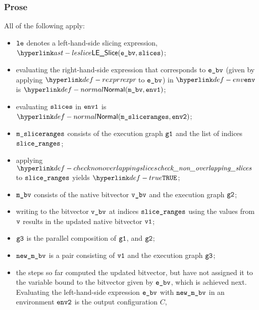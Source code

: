 \subsubsection{Prose}
All of the following apply:
\begin{itemize}
  \item $\texttt{le}$ denotes a left-hand-side slicing expression, $\LESlice(\ebv, \slices)$;
  \item evaluating the right-hand-side expression that corresponds to $\texttt{e\_bv}$
  (given by applying $\torexpr$ to $\texttt{e\_bv}$) in $\env$
    is $\Normal(\mbv,\envone)$\ProseOrAbnormal;
  \item evaluating $\texttt{slices}$ in $\texttt{env1}$ is $\Normal(\msliceranges, \envtwo)$\ProseOrAbnormal;
  \item $\texttt{m\_sliceranges}$ consists of the execution graph $\texttt{g1}$ and the list of indices\\
         $\texttt{slice\_ranges}$;
  \item applying $\checknonoverlappingslices$ to $\texttt{slice\_ranges}$ yields $\True$\ProseOrError;
  \item $\texttt{m\_bv}$ consists of the native bitvector $\texttt{v\_bv}$ and the execution graph $\texttt{g2}$;
  \item writing to the bitvector $\texttt{v\_bv}$ at indices $\texttt{slice\_ranges}$ using the values from $\texttt{v}$
  results in the updated native bitvector $\texttt{v1}$\ProseOrError;
  \item $\texttt{g3}$ is the parallel composition of $\texttt{g1}$, and $\texttt{g2}$;
  \item $\texttt{new\_m\_bv}$ is a pair consisting of $\texttt{v1}$ and the execution graph $\texttt{g3}$;
  \item the steps so far computed the updated bitvector, but have not assigned it to the
  variable bound to the bitvector given by $\texttt{e\_bv}$, which is achieved next.
  Evaluating the left-hand-side expression $\texttt{e\_bv}$ with
  $\texttt{new\_m\_bv}$ in an environment $\texttt{env2}$ is the output configuration $C$,
\end{itemize}
